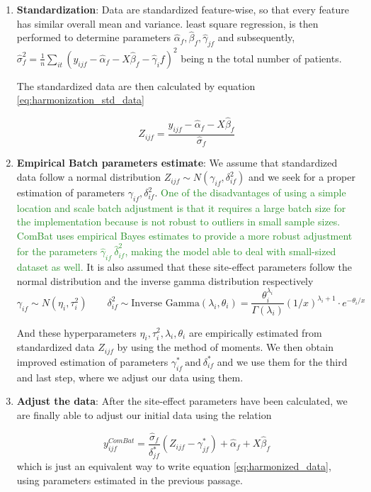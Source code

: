 \documentclass[11pt]{report}
\begin{document}
\begin{enumerate}
\item \textbf{Standardization}: Data are standardized feature-wise, so that every feature has similar overall mean and variance.
least square regression, is then performed to determine parameters $\hat \alpha_f, \hat \beta_f, \hat \gamma_{jf}$ and subsequently, $\hat \sigma^2_f = \frac{1}{n} \sum_{it} \left ( y_{ijf} - \hat \alpha_f - X \hat \beta_f - \hat \gamma_if \right )^2$ being n the total number of patients.


The standardized data are then calculated by equation \ref{eq:harmonization_std_data}

\begin{equation}\label{eq:harmonization_std_data}
Z_{ijf} = \frac{y_{ijf}-\hat \alpha_f - X \hat \beta_f}{\hat \sigma_f}
\end{equation}


\item \textbf{Empirical Batch parameters estimate}:
We assume that standardized data follow a normal distribution $Z_{ijf} \sim N(\gamma_{if}, \delta^2_{if})$ and we seek for a proper estimation of parameters $\gamma_{if}, \delta^2_{if}$.
\textcolor{ForestGreen}{
One of the disadvantages of using a simple location and scale batch adjustment is that it requires a large batch size for the implementation because is not robust to outliers in small sample sizes.
ComBat uses empirical Bayes estimates to provide a more robust adjustment for the parameters $\hat \gamma_{if} \ \hat \delta^2_{if}$, making the model able to deal with small-sized dataset as well.
}
It is also assumed that these site-effect parameters follow the normal distribution and the inverse gamma distribution respectively
\[
\gamma_{if} \sim N(\eta_i, \tau^2_i)  \qquad \delta^2_{if} \sim \text{Inverse Gamma}(\lambda_i, \theta_i) =  \frac{\theta_i^{\lambda_i}}{\Gamma (\lambda_i)}(1/x)^{\lambda_i +1}\cdot e^{-\theta_i/x}
\]

And these hyperparameters $\eta_i, \tau^2_i, \lambda_i, \theta_i$ are empirically estimated from standardized data  $Z_{ijf}$ by using the method of moments.
We then obtain improved estimation of parameters $\gamma^\ast_{if} \ \text{and} \ \delta^\ast_{if}$ and we use them for the third and last step, where we adjust our data using them.

\item \textbf{Adjust the data}: After the site-effect parameters have been calculated, we are finally able to adjust our initial data using the relation

\begin{equation}
y^{ComBat}_{ijf} = \frac{\hat \sigma_f}{\delta^\ast_{jf}}(Z_{ijf} - \gamma^\ast_{jf}) + \hat \alpha_f + X \hat \beta_f
\end{equation}
which is just an equivalent way to write equation \ref{eq:harmonized_data}, using parameters estimated in the previous passage.
\end{enumerate}
\end{document}
